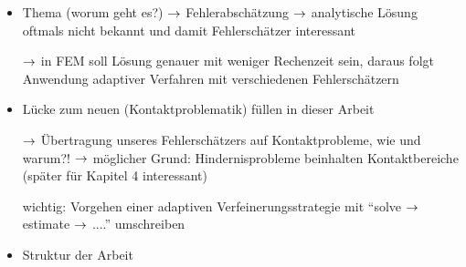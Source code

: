 \label{kap:1}

\begin{itemize}
\item Thema (worum geht es?) $\rightarrow$ Fehlerabschätzung $\rightarrow$ analytische Lösung oftmals nicht bekannt und damit Fehlerschätzer interessant
\item[$\rightarrow$] in FEM soll Lösung genauer mit weniger Rechenzeit sein, daraus folgt Anwendung adaptiver Verfahren mit verschiedenen Fehlerschätzern
\item Lücke zum neuen (Kontaktproblematik) füllen in dieser Arbeit
\item[$\rightarrow$] Übertragung unseres Fehlerschätzers auf Kontaktprobleme, wie und warum?! $\rightarrow$ möglicher Grund: Hindernisprobleme beinhalten Kontaktbereiche (später für Kapitel 4 interessant)
\item[wichtig:] Vorgehen einer adaptiven Verfeinerungsstrategie mit "`solve $\rightarrow$ estimate $\rightarrow$ ...."' umschreiben
\item Struktur der Arbeit
\end{itemize}


\newpage

